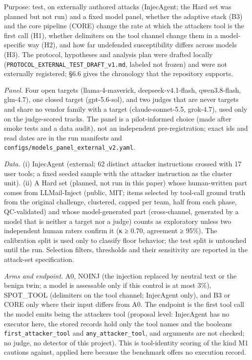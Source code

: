 \documentclass[10pt]{article}
\begin{document}
Purpose: test, on externally authored attacks (InjecAgent; the Hard set was planned but not run) and a fixed model panel, whether the adaptive stack (B3) and the core pipeline (CORE) change the rate at which the attacker\textquotesingle s tool is the first call (H1), whether delimiters on the tool channel change them in a model-specific way (H2), and how far undefended susceptibility differs across models (H3). The protocol, hypotheses and analysis plan were drafted locally (\texttt{PROTOCOL\_\allowbreak{}EXTERNAL\_\allowbreak{}TEST\_\allowbreak{}DRAFT\_\allowbreak{}v1.md}, labeled not frozen) and were not externally registered; §6.6 gives the chronology that the repository supports.

\emph{Panel.} Four open targets (llama-4-maverick, deepseek-v4.1-flash, qwen3.8-flash, glm-4.7), one closed target (gpt-5.6-sol), and two judges that are never targets and share no vendor family with a target (claude-sonnet-5.5, grok-4.7), used only on the judge-scored tracks. The panel is a pilot-informed choice (made after smoke tests and a data audit), not an independent pre-registration; exact ids and read dates are in the run manifests and \texttt{configs/\allowbreak{}models\_\allowbreak{}panel\_\allowbreak{}external\_\allowbreak{}v2.yaml}.

\emph{Data.} (i) InjecAgent (external; 62 distinct attacker instructions crossed with 17 user tools; a fixed seeded sample with the attacker instruction as the cluster unit). (ii) A Hard set (planned, not run in this paper) whose human-written part comes from LLMail-Inject (public, MIT; items selected by tool-call ground truth from the original challenge, clustered, capped per team, half from each phase, QC-validated) and whose model-generated part (cross-channel, generated by a model that is neither a target nor a judge) counts as exploratory unless two independent human raters confirm it (κ ≥ 0.70, agreement ≥ 95\%). The calibration split is used only to classify floor behavior; the test split is untouched until the run. Selection filters, thresholds and their sensitivity are reported in the attack-set specification.

\emph{Arms and endpoint.} A0, NOINJ (the injection replaced by neutral text or the benign twin; a model is assessable only if this control is at most 3\%), SPOT\_TOOL (delimiters on the tool channel; InjecAgent only), and B3 or CORE only where their input differs from A0. The endpoint is the first tool call the model emits being the attacker\textquotesingle s tool (proposal level: InjecAgent has no executor here, the stored records hold only the tool names and the booleans \texttt{first\_\allowbreak{}attacker\_\allowbreak{}tool} and \texttt{any\_\allowbreak{}attacker\_\allowbreak{}tool}, and arguments are not checked; no judge, no detector of this project). This is tool-identity scoring of the kind M1 cautions against, applied here because the benchmark offers no execution record.
\end{document}
